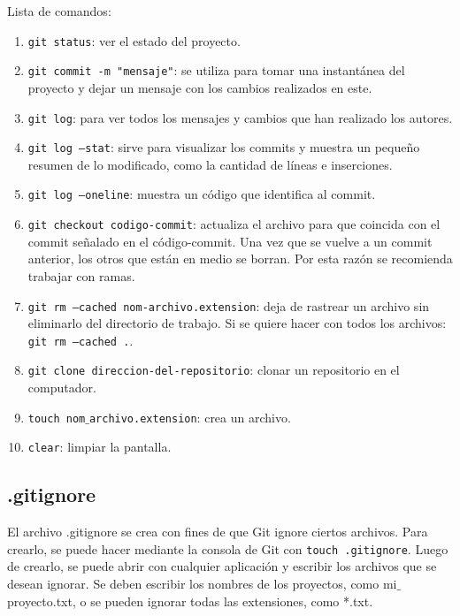 \documentclass[a4paper, 12pt]{book}
\begin{document}
Lista de comandos: 
\begin{enumerate}
\item \texttt{git status}: ver el estado del proyecto.
\item \texttt{git commit -m "mensaje"}: se utiliza para tomar una instantánea del proyecto y dejar un mensaje con los cambios realizados en este.
\item \texttt{git log}: para ver todos los mensajes y cambios que han realizado los autores.
\item \texttt{git log --stat}: sirve para visualizar los commits y muestra un pequeño resumen de lo modificado, como la cantidad de líneas e inserciones.
\item \texttt{git log --oneline}: muestra un código que identifica al commit.
\item \texttt{git checkout codigo-commit}: actualiza el archivo para que coincida con el commit señalado en el código-commit. Una vez que se vuelve a un commit anterior, los otros que están en medio se borran. Por esta razón se recomienda trabajar con ramas.
\item \texttt{git rm --cached nom-archivo.extension}: deja de rastrear un archivo sin eliminarlo del directorio de trabajo. Si se quiere hacer con todos los archivos: \texttt{git rm --cached .}.
\item \texttt{git clone direccion-del-repositorio}: clonar un repositorio en el computador.
\item \texttt{touch nom$\_$archivo.extension}: crea un archivo.
\item \texttt{clear}: limpiar la pantalla.
\end{enumerate}
\subsection{.gitignore}
El archivo .gitignore se crea con fines de que Git ignore ciertos archivos. Para crearlo, se puede hacer mediante la consola de Git con \texttt{touch .gitignore}. Luego de crearlo, se puede abrir con cualquier aplicación y escribir los archivos que se desean ignorar. Se deben escribir los nombres de los proyectos, como mi$\_$proyecto.txt, o se pueden ignorar todas las extensiones, como *.txt.

\end{document}
